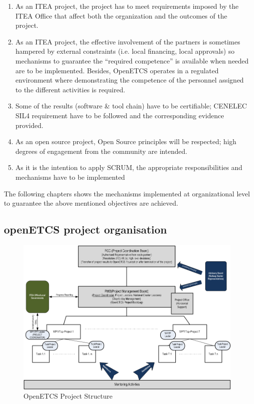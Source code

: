 \documentclass{template/openetcs_article}
\begin{document}
\begin{enumerate}
\item As an ITEA project, the project has to meet requirements imposed by the ITEA Office that affect both the organization and the outcomes of the project.
\item As an ITEA project, the effective involvement of the partners is sometimes hampered by external constraints (i.e. local financing, local approvals) so mechanisms to guarantee the “required competence” is available when needed are to be implemented. Besides, OpenETCS operates in a regulated environment where demonstrating the competence of the personnel assigned to the different activities is required. 
\item Some of the results (software \& tool chain) have to be certifiable; CENELEC SIL4 requirement \citep{subset026} have to be followed and the corresponding evidence provided. 
\item As an open source project, Open Source principles will be respected; high degrees of engagement from the community are intended.
\item As it is the intention to apply SCRUM, the appropriate responsibilities and mechanisms have to be implemented
\end{enumerate}

The following chapters shows the mechanisms implemented at organizational level to guarantee the above mentioned objectives are achieved.


\subsection{openETCS project organisation}

\begin{figure}[H]
\centering
\includegraphics[scale=0.6]{./figures/project_structure.png}
\caption{OpenETCS Project Structure}
\end{figure}
\end{document}
